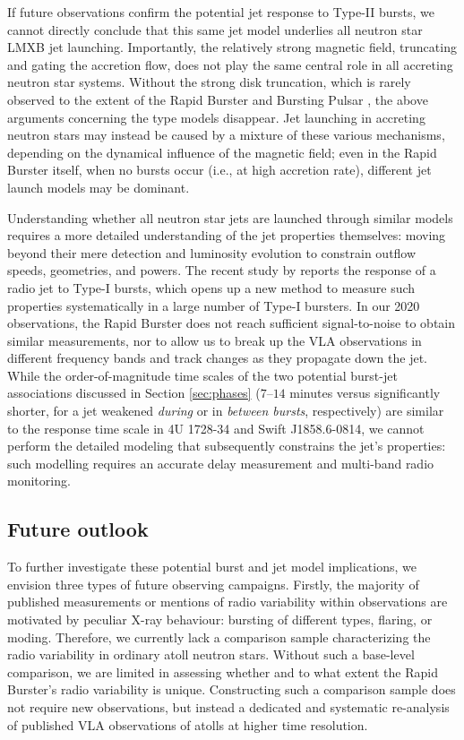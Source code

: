 \documentclass[fleqn,usenatbib]{mnras}
\begin{document}
If future observations confirm the potential jet response to Type-II bursts, we cannot directly conclude that this same jet model underlies all neutron star LMXB jet launching. Importantly, the relatively strong magnetic field, truncating and gating the accretion flow, does not play the same central role in all accreting neutron star systems. Without the strong disk truncation, which is rarely observed to the extent of the Rapid Burster and Bursting Pulsar \citep{ludlam2024}, the above arguments concerning the \citet{blandford1982} type models disappear. Jet launching in accreting neutron stars may instead be caused by a mixture of these various mechanisms, depending on the dynamical influence of the magnetic field; even in the Rapid Burster itself, when no bursts occur (i.e., at high accretion rate), different jet launch models may be dominant. 

Understanding whether all neutron star jets are launched through similar models requires a more detailed understanding of the jet properties themselves: moving beyond their mere detection and luminosity evolution to constrain outflow speeds, geometries, and powers. The recent study by \citet{russell2024} reports the response of a radio jet to Type-I bursts, which opens up a new method to measure such properties systematically in a large number of Type-I bursters. In our 2020 observations, the Rapid Burster does not reach sufficient signal-to-noise to obtain similar measurements, nor to allow us to break up the VLA observations in different frequency bands and track changes as they propagate down the jet. While the order-of-magnitude time scales of the two potential burst-jet associations discussed in Section \ref{sec:phases} ($7$--$14$ minutes versus significantly shorter, for a jet weakened \textit{during} or in \textit{between bursts}, respectively) are similar to the response time scale in 4U 1728-34 and Swift J1858.6-0814, we cannot perform the detailed modeling that subsequently constrains the jet's properties: such modelling requires an accurate delay measurement and multi-band radio monitoring. 

\subsection{Future outlook}
\label{sec:future}

To further investigate these potential burst and jet model implications, we envision three types of future observing campaigns. Firstly, the majority of published measurements or mentions of radio variability within observations are motivated by peculiar X-ray behaviour: bursting of different types, flaring, or moding. Therefore, we currently lack a comparison sample characterizing the radio variability in ordinary atoll neutron stars. Without such a base-level comparison, we are limited in assessing whether and to what extent the Rapid Burster’s radio variability is unique. Constructing such a comparison sample does not require new observations, but instead a dedicated and systematic re-analysis of published VLA observations of atolls at higher time resolution.
\end{document}
